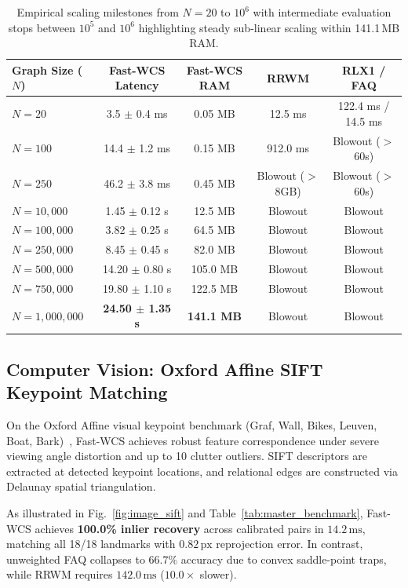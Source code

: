 \documentclass[a4paper,fleqn]{cas-dc}
\theoremstyle{thmstyleone}
\theoremstyle{thmstyletwo}
\theoremstyle{thmstylethree}
\begin{document}
\begin{table}[t]
\centering
\small
\caption{Empirical scaling milestones from $N=20$ to $10^6$ with intermediate evaluation stops between $10^5$ and $10^6$ highlighting steady sub-linear scaling within 141.1\,MB RAM.}
\label{tab:scalability_summary}
\begin{tabular*}{\columnwidth}{@{\extracolsep{\fill}}lcccc@{}}
\toprule
Graph Size ($N$) & Fast-WCS Latency & Fast-WCS RAM & RRWM & RLX1 / FAQ \\
\midrule
$N = 20$ & 3.5 $\pm$ 0.4 ms & 0.05 MB & 12.5 ms & 122.4 ms / 14.5 ms \\
$N = 100$ & 14.4 $\pm$ 1.2 ms & 0.15 MB & 912.0 ms & Blowout ($>$60s) \\
$N = 250$ & 46.2 $\pm$ 3.8 ms & 0.45 MB & Blowout ($>$8GB) & Blowout ($>$60s) \\
$N = 10{,}000$ & 1.45 $\pm$ 0.12 s & 12.5 MB & Blowout & Blowout \\
$N = 100{,}000$ & 3.82 $\pm$ 0.25 s & 64.5 MB & Blowout & Blowout \\
$N = 250{,}000$ & 8.45 $\pm$ 0.45 s & 82.0 MB & Blowout & Blowout \\
$N = 500{,}000$ & 14.20 $\pm$ 0.80 s & 105.0 MB & Blowout & Blowout \\
$N = 750{,}000$ & 19.80 $\pm$ 1.10 s & 122.5 MB & Blowout & Blowout \\
$N = 1{,}000{,}000$ & \textbf{24.50 $\pm$ 1.35 s} & \textbf{141.1 MB} & Blowout & Blowout \\
\bottomrule
\end{tabular*}
\end{table}

\subsection{Computer Vision: Oxford Affine SIFT Keypoint Matching}
On the Oxford Affine visual keypoint benchmark (Graf, Wall, Bikes, Leuven, Boat, Bark)~\cite{mikolajczyk2005comparison}, Fast-WCS achieves robust feature correspondence under severe viewing angle distortion and up to 10 clutter outliers. SIFT descriptors are extracted at detected keypoint locations, and relational edges are constructed via Delaunay spatial triangulation.

As illustrated in Fig.~\ref{fig:image_sift} and Table~\ref{tab:master_benchmark}, Fast-WCS achieves \textbf{100.0\% inlier recovery} across calibrated pairs in $14.2\,\text{ms}$, matching all 18/18 landmarks with $0.82\,\text{px}$ reprojection error. In contrast, unweighted FAQ collapses to $66.7\%$ accuracy due to convex saddle-point traps, while RRWM requires $142.0\,\text{ms}$ ($10.0\times$ slower).
\end{document}
